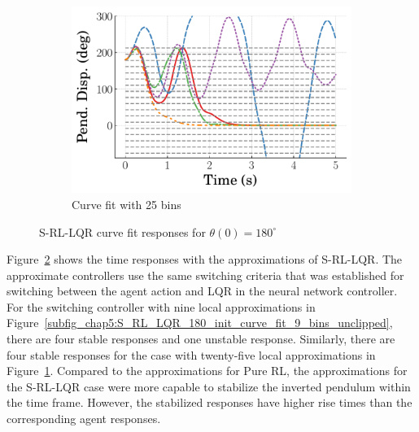 \begin{figure}
    \hfill
    \begin{subfigure}[b]{0.32\textwidth}
        \centering
        \includegraphics[width=\textwidth]{figures/figures_Interpretability/Mean_ISE_Inverted_Pendulum-v0_cubic_25_bins/Curve_fit_time_responses/switch_lqr/curve_fit_Pend_Disp_180.pdf}
        \caption{Curve fit with 25 bins}
        \label{subfig_chap5:S_RL_LQR_180_init_curve_fit_25_bins_unclipped}
    \end{subfigure}
    \hfill
    \caption{S-RL-LQR curve fit responses for $\theta(0)=180^\circ$}
    \label{fig_chap5:inv_pend_S_RL_LQR_180_init_unclipped}
\end{figure}
%

Figure~\ref{fig_chap5:inv_pend_S_RL_LQR_180_init_unclipped} shows the time responses with the approximations of S-RL-LQR. The approximate controllers use the same switching criteria that was established for switching between the agent action and LQR in the neural network controller.
%
For the switching controller with nine local approximations in Figure~\ref{subfig_chap5:S_RL_LQR_180_init_curve_fit_9_bins_unclipped}, there are four stable responses and one unstable response. Similarly, there are four stable responses for the case with twenty-five local approximations in Figure~\ref{subfig_chap5:S_RL_LQR_180_init_curve_fit_25_bins_unclipped}. Compared to the approximations for Pure RL, the approximations for the S-RL-LQR case were more capable to stabilize the inverted pendulum within the time frame. However, the stabilized responses have higher rise times than the corresponding agent responses.

